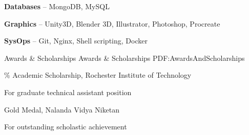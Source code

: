 \documentclass[letterpaper,MMMyyyy,nonstopmode]{simpleresumecv}
\begin{document}
\begin{Body}
\BulletItem
\textbf{Databases} -- MongoDB, MySQL
\Gap

\BulletItem
\textbf{Graphics} -- Unity3D, Blender 3D, Illustrator, Photoshop, Procreate
\Gap

\BulletItem
\textbf{SysOps} -- Git, Nginx, Shell scripting, Docker
\Gap


\Section
{Awards \&\newline
Scholarships}
{Awards \& Scholarships}
{PDF:AwardsAndScholarships}

\% Academic Scholarship,
Rochester Institute of Technology
\begin{Detail}
\Item
For graduate technical assistant position
\end{Detail}

\Gap

\BulletItem
Gold Medal,
Nalanda Vidya Niketan
\begin{Detail}
\Item
For outstanding scholastic achievement
\end{Detail}
\end{Body}
\end{document}
